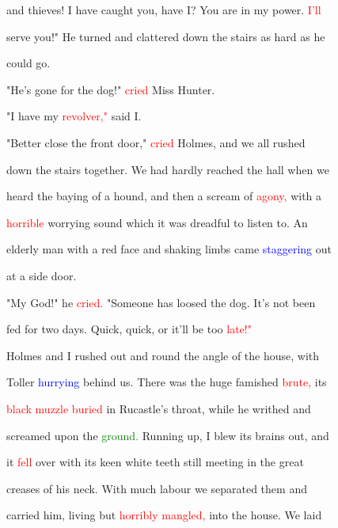  and \textcolor{BurntOrange}{thieves!} I have caught you, have I? You are in my power. \textcolor{red}{I'll}

 \textcolor{BurntOrange}{serve} you!" He turned and clattered down the stairs as hard as he

 could go.



 "He's gone for the dog!" \textcolor{red}{cried} Miss \textcolor{BurntOrange}{Hunter.}



 "I have my \textcolor{red}{revolver,"} said I.



 "Better close the front door," \textcolor{red}{cried} Holmes, and we all rushed

 down the stairs together. We had hardly reached the hall when we

 heard the baying of a hound, and then a \textcolor{BurntOrange}{scream} of \textcolor{red}{agony,} with a

 \textcolor{red}{horrible} \textcolor{BurntOrange}{worrying} sound which it was \textcolor{BurntOrange}{dreadful} to listen to. An

 elderly man with a red face and shaking limbs came \textcolor{blue}{staggering} out

 at a side door.



 "My \textcolor{BurntOrange}{God!"} he \textcolor{red}{cried.} "Someone has loosed the dog. It's not been

 fed for two days. Quick, quick, or it'll be too \textcolor{red}{late!"}



 Holmes and I rushed out and round the angle of the house, with

 Toller \textcolor{blue}{hurrying} behind us. There was the huge famished \textcolor{red}{brute,} its

 \textcolor{red}{black} \textcolor{red}{muzzle} \textcolor{red}{buried} in Rucastle's throat, while he writhed and

 \textcolor{BurntOrange}{screamed} upon the \textcolor{green}{ground.} Running up, I blew its brains out, and

 it \textcolor{red}{fell} over with its keen \textcolor{BurntOrange}{white} teeth still meeting in the great

 creases of his neck. With much labour we separated them and

 carried him, living but \textcolor{red}{horribly} \textcolor{red}{mangled,} into the house. We laid

